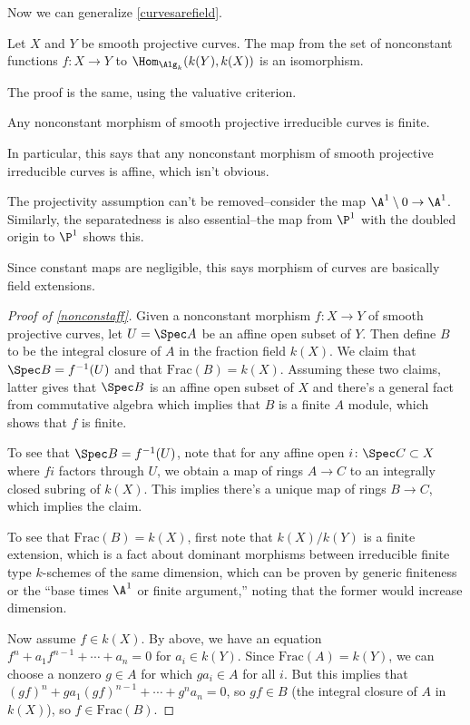 Now we can generalize \cref{curvesarefield}.
\begin{prop}
\label{nonconst}
Let $X$ and $Y$ be smooth projective curves. The map from the set of nonconstant functions $f\colon X\to Y$ to
$\Hom_{\Alg_k}(k(Y), k(X))$ is an isomorphism.
\end{prop}
The proof is the same, using the valuative criterion.
\begin{thm}
\label{nonconstaff}
Any nonconstant morphism of smooth projective irreducible curves is finite.
\end{thm}
In particular, this says that any nonconstant morphism of smooth projective irreducible curves is affine, which isn't obvious.
\begin{rem}
The projectivity assumption can't be removed--consider the map $\A^1\setminus 0 \to \A^1$. Similarly, the separatedness is also essential--the map from $\P^1$ with the doubled origin to $\P^1$ shows this. 
\end{rem}
Since constant maps are negligible, this says morphism of curves are basically field extensions.
\begin{proof}[Proof of \cref{nonconstaff}]
Given a nonconstant morphism $f\colon X \to Y$ of smooth projective curves, let $U = \Spec A$ be an affine open
subset of $Y$. Then define $B$ to be the integral closure of $A$ in the fraction field $k(X)$. We claim that $\Spec
B = f^{-1}(U)$ and that $\mathrm{Frac}(B) = k(X)$. Assuming these two claims, latter gives that $\Spec B$ is an affine open subset of $X$ and there's a general fact from commutative algebra which implies that $B$ is a finite $A$ module, which shows that $f$ is finite.

To see that $\Spec B = f^{-1}(U)$, note that for any affine open $i\colon \Spec C \subset X$ where $fi$ factors
through $U$, we obtain a map of rings $A \to C$ to an integrally closed subring of $k(X)$. This implies there's a unique map of rings $B \to C$, which implies the claim.

To see that $\mathrm{Frac}(B) = k(X)$, first note that $k(X)/k(Y)$ is a finite extension, which is a fact about
dominant morphisms between irreducible finite type $k$-schemes of the same dimension, which can be proven by
generic finiteness or the ``base times $\A^1$ or finite argument,'' noting that the former would increase dimension.

Now assume $f \in k(X)$. By above, we have an equation $f^n + a_{1}f^{n-1} + \dotsb + a_n = 0$ for $a_i \in k(Y)$.
Since $\mathrm{Frac}(A) = k(Y)$, we can choose a nonzero $g \in A$ for which $ga_i \in A$ for all $i$. But this
implies that $(gf)^n + ga_1(gf)^{n-1} + \dotsb + g^na_n = 0$, so $gf \in B$ (the integral closure of $A$ in
$k(X)$), so $f \in \mathrm{Frac}(B)$.
\end{proof}
